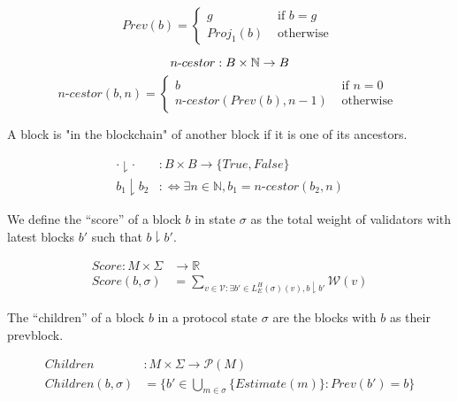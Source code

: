 \[ Prev(b) = \left\{
\begin{array}{ll}
      g& \text{ if $b = g$ } \\
      Proj_1(b)& \text{ otherwise }
\end{array}
\right. \]


\begin{defn}
$$
n\text{-}cestor : B \times \mathbb{N} \to B\\
$$
\[ n\text{-}cestor(b, n) = \left\{
\begin{array}{ll}
      b& \text{ if $n = 0$ } \\
      n\text{-}cestor(Prev(b), n - 1)& \text{ otherwise }
\end{array}
\right. \]
\end{defn}


A block is "in the blockchain" of another block if it is one of its ancestors.

\begin{defn}
\begin{align*}
\cdot \downharpoonright \cdot&: B \times B \to \{True, False\} \\
b_1 \downharpoonright b_2 &:\Leftrightarrow \exists n \in \mathbb{N}, b_1 = n\text{-}cestor(b_2, n)
\end{align*}
\end{defn}

We define the ``score'' of a block $b$ in state $\sigma$ as the total weight of validators with latest blocks $b'$ such that $b \downharpoonright b'$.

\begin{defn}
\begin{align*}
Score: M \times \Sigma &\to \mathbb{R} \\
Score(b, \sigma) &= \sum_{v \in \mathcal{V} : \exists b' \in L^H_E(\sigma)(v), b \downharpoonright b'} \mathcal{W}(v)
\end{align*}
\end{defn}


The ``children'' of a block $b$ in a protocol state $\sigma$ are the blocks with $b$ as their prevblock.

\begin{defn}
\begin{align*}
Children&: M \times \Sigma \to \mathcal{P}(M)\\
Children(b,\sigma) &= \{b' \in \bigcup_{m \in \sigma} \{Estimate(m)\} : Prev(b') = b\}
\end{align*}
\end{defn}

